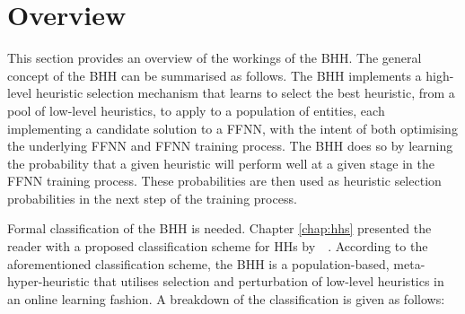 \section{Overview}\label{sec:bhh:overview}

This section provides an overview of the workings of the \Acf{BHH}. The general concept of the \acs{BHH} can be summarised as follows. The \acs{BHH} implements a high-level heuristic selection mechanism that learns to select the best heuristic, from a pool of low-level heuristics, to apply to a population of entities, each implementing a candidate solution to a \acs{FFNN}, with the intent of both optimising the underlying \acs{FFNN} and \acs{FFNN} training process. The \acs{BHH} does so by learning the probability that a given heuristic will perform well at a given stage in the \acs{FFNN} training process. These probabilities are then used as heuristic selection probabilities in the next step of the training process.

Formal classification of the \Acs{BHH} is needed. Chapter \ref{chap:hhs} presented the reader with a proposed classification scheme for \acp{HH} by~\citeauthor{ref:burke:2010}~\cite{ref:burke:2010}. According to the aforementioned classification scheme, the \Acs{BHH} is a population-based, meta-hyper-heuristic that utilises selection and perturbation of low-level heuristics in an online learning fashion. A breakdown of the classification is given as follows:

